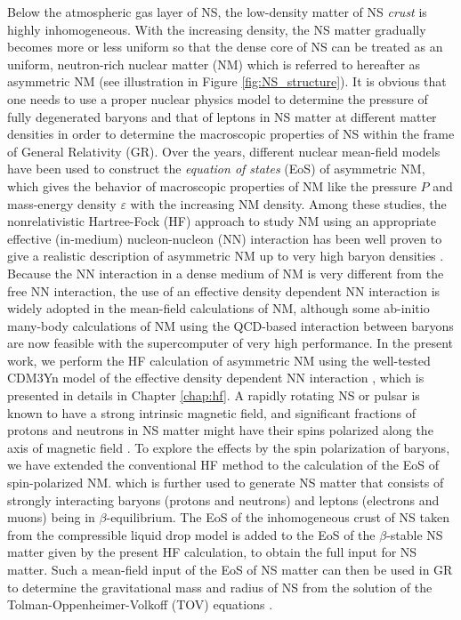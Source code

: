 Below the atmospheric gas layer of \gls{NS}, the low-density matter of NS \emph{crust}
is highly inhomogeneous. With the increasing density, the NS matter gradually becomes more 
or less uniform so that the dense core of NS can be treated as an uniform, neutron-rich
nuclear matter (NM) which is referred to hereafter as asymmetric NM (see illustration in  
Figure \ref{fig:NS_structure}). It is obvious that one needs to use a proper nuclear physics
model to determine the pressure of fully degenerated baryons and that of leptons in NS matter 
at different matter densities in order to determine the macroscopic properties of NS 
within the frame of General Relativity (GR). Over the years, different nuclear mean-field 
models have been used to construct the \emph{equation of states} (\gls{EoS}) of asymmetric NM, 
which gives the behavior of macroscopic properties of NM like the pressure $P$ and mass-energy 
density $\varepsilon$ with the increasing NM density. Among these studies, the nonrelativistic
Hartree-Fock (\gls{HF}) approach to study NM using an appropriate effective (in-medium) 
nucleon-nucleon (NN) interaction has been well proven to give a realistic description 
of asymmetric NM up to very high baryon densities \cite{Khoa NPA96}. Because the NN 
interaction in a dense medium of NM is very different from the free NN interaction, the use 
of an effective density dependent NN interaction is widely adopted in the mean-field 
calculations of NM, although 
some ab-initio many-body calculations of NM using the QCD-based interaction between baryons
are now feasible with the supercomputer of very high performance. In the present work, we
perform the HF calculation of asymmetric NM using the well-tested CDM3Yn model of the effective
density dependent NN interaction \citep{tan2021equation}, which is presented in details
in Chapter \ref{chap:hf}. A rapidly rotating NS or pulsar is known to have a strong intrinsic 
magnetic field, and significant fractions of protons and neutrons in NS matter might  
have their spins polarized along the axis of magnetic field  \cite{?}. To explore the effects 
by the spin polarization of baryons, we have extended the conventional HF method to the calculation
of the EoS of spin-polarized NM. which is further used to generate NS matter that consists 
of strongly interacting baryons (protons and neutrons) and leptons (electrons and muons) 
being in $\beta$-equilibrium. The EoS of the inhomogeneous crust of NS taken from the 
compressible liquid drop model \cite{?} is added to the \gls{EoS} of the $\beta$-stable 
NS matter given by the present \gls{HF} calculation, to obtain the full input
for NS matter. Such a mean-field input of the EoS of NS matter can then be used in GR 
to determine the gravitational mass and radius of NS \citep{tan2020spin,tan2021equation} 
from the solution of the Tolman-Oppenheimer-Volkoff (\gls{TOV}) equations \cite{?}. 

